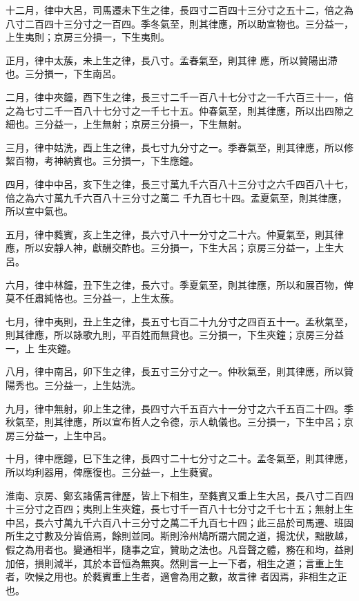 \begin{pinyinscope}
 十二月，律中大呂，司馬遷未下生之律，長四寸二百四十三分寸之五十二，倍之為八寸二百四十三分寸之一百四。季冬氣至，則其律應，所以助宣物也。三分益一，上生夷則；京房三分損一，下生夷則。



 正月，律中太蔟，未上生之律，長八寸。孟春氣至，則其律
 應，所以贊陽出滯也。三分損一，下生南呂。



 二月，律中夾鐘，酉下生之律，長三寸二千一百八十七分寸之一千六百三十一，倍之為七寸二千一百八十七分寸之一千七十五。仲春氣至，則其律應，所以出四隙之細也。三分益一，上生無射；京房三分損一，下生無射。



 三月，律中姑洗，酉上生之律，長七寸九分寸之一。季春氣至，則其律應，所以修絜百物，考神納賓也。三分損一，下生應鐘。



 四月，律中中呂，亥下生之律，長三寸萬九千六百八十三分寸之六千四百八十七，倍之為六寸萬九千六百八十三分寸之萬二
 千九百七十四。孟夏氣至，則其律應，所以宣中氣也。



 五月，律中蕤賓，亥上生之律，長六寸八十一分寸之二十六。仲夏氣至，則其律應，所以安靜人神，獻酬交酢也。三分損一，下生大呂；京房三分益一，上生大呂。



 六月，律中林鐘，丑下生之律，長六寸。季夏氣至，則其律應，所以和展百物，俾莫不任肅純恪也。三分益一，上生太蔟。



 七月，律中夷則，丑上生之律，長五寸七百二十九分寸之四百五十一。孟秋氣至，則其律應，所以詠歌九則，平百姓而無貸也。三分損一，下生夾鐘；京房三分益一，上
 生夾鐘。



 八月，律中南呂，卯下生之律，長五寸三分寸之一。仲秋氣至，則其律應，所以贊陽秀也。三分益一，上生姑洗。



 九月，律中無射，卯上生之律，長四寸六千五百六十一分寸之六千五百二十四。季秋氣至，則其律應，所以宣布哲人之令德，示人軌儀也。三分損一，下生中呂；京房三分益一，上生中呂。



 十月，律中應鐘，巳下生之律，長四寸二十七分寸之二十。孟冬氣至，則其律應，所以均利器用，俾應復也。三分益一，上生蕤賓。



 淮南、京房、鄭玄諸儒言律歷，皆上下相生，至蕤賓又重上生大呂，長八寸二百四十三分寸之百四；夷則上生夾鐘，長七寸千一百八十七分寸之千七十五；無射上生中呂，長六寸萬九千六百八十三分寸之萬二千九百七十四；此三品於司馬遷、班固所生之寸數及分皆倍焉，餘則並同。斯則泠州鳩所謂六間之道，揚沈伏，黜散越，假之為用者也。變通相半，隨事之宜，贊助之法也。凡音聲之體，務在和均，益則加倍，損則減半，其於本音恒為無爽。然則言一上一下者，相生之道；言重上生者，吹候之用也。於蕤賓重上生者，適會為用之數，故言律
 者因焉，非相生之正也。




\end{pinyinscope}
